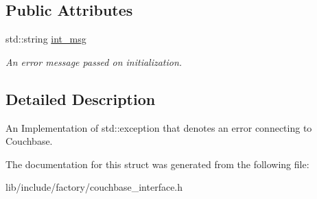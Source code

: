 \subsection*{Public Attributes}
\begin{DoxyCompactItemize}
\item 
\hypertarget{structCouchbaseConnectException_a23038f9bf06ec009f0b3c3ac22812415}{std\-::string \hyperlink{structCouchbaseConnectException_a23038f9bf06ec009f0b3c3ac22812415}{int\-\_\-msg}}\label{structCouchbaseConnectException_a23038f9bf06ec009f0b3c3ac22812415}

\begin{DoxyCompactList}\small\item\em An error message passed on initialization. \end{DoxyCompactList}\end{DoxyCompactItemize}


\subsection{Detailed Description}
An Implementation of std\-::exception that denotes an error connecting to Couchbase. 

The documentation for this struct was generated from the following file\-:\begin{DoxyCompactItemize}
\item 
lib/include/factory/couchbase\-\_\-interface.\-h\end{DoxyCompactItemize}

